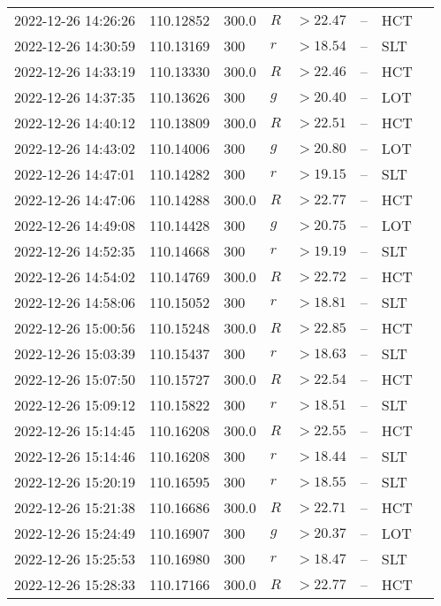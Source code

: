 \documentclass{nature_plusfigure}
\begin{document}
\begin{supplement}
\begin{center}
\begin{longtable}{llllllll}
2022-12-26 14:26:26 & 110.12852 & 300.0 & $R$ & $>22.47$ & -- & HCT &  \\ 
2022-12-26 14:30:59 & 110.13169 & 300 & $r$ & $>18.54$ & -- & SLT &  \\ 
2022-12-26 14:33:19 & 110.13330 & 300.0 & $R$ & $>22.46$ & -- & HCT &  \\ 
2022-12-26 14:37:35 & 110.13626 & 300 & $g$ & $>20.40$ & -- & LOT &  \\ 
2022-12-26 14:40:12 & 110.13809 & 300.0 & $R$ & $>22.51$ & -- & HCT &  \\ 
2022-12-26 14:43:02 & 110.14006 & 300 & $g$ & $>20.80$ & -- & LOT &  \\ 
2022-12-26 14:47:01 & 110.14282 & 300 & $r$ & $>19.15$ & -- & SLT &  \\ 
2022-12-26 14:47:06 & 110.14288 & 300.0 & $R$ & $>22.77$ & -- & HCT &  \\ 
2022-12-26 14:49:08 & 110.14428 & 300 & $g$ & $>20.75$ & -- & LOT &  \\ 
2022-12-26 14:52:35 & 110.14668 & 300 & $r$ & $>19.19$ & -- & SLT &  \\ 
2022-12-26 14:54:02 & 110.14769 & 300.0 & $R$ & $>22.72$ & -- & HCT &  \\ 
2022-12-26 14:58:06 & 110.15052 & 300 & $r$ & $>18.81$ & -- & SLT &  \\ 
2022-12-26 15:00:56 & 110.15248 & 300.0 & $R$ & $>22.85$ & -- & HCT &  \\ 
2022-12-26 15:03:39 & 110.15437 & 300 & $r$ & $>18.63$ & -- & SLT &  \\ 
2022-12-26 15:07:50 & 110.15727 & 300.0 & $R$ & $>22.54$ & -- & HCT &  \\ 
2022-12-26 15:09:12 & 110.15822 & 300 & $r$ & $>18.51$ & -- & SLT &  \\ 
2022-12-26 15:14:45 & 110.16208 & 300.0 & $R$ & $>22.55$ & -- & HCT &  \\ 
2022-12-26 15:14:46 & 110.16208 & 300 & $r$ & $>18.44$ & -- & SLT &  \\ 
2022-12-26 15:20:19 & 110.16595 & 300 & $r$ & $>18.55$ & -- & SLT &  \\ 
2022-12-26 15:21:38 & 110.16686 & 300.0 & $R$ & $>22.71$ & -- & HCT &  \\ 
2022-12-26 15:24:49 & 110.16907 & 300 & $g$ & $>20.37$ & -- & LOT &  \\ 
2022-12-26 15:25:53 & 110.16980 & 300 & $r$ & $>18.47$ & -- & SLT &  \\ 
2022-12-26 15:28:33 & 110.17166 & 300.0 & $R$ & $>22.77$ & -- & HCT &  \\ 

\end{longtable}
\end{center}
\end{supplement}
\end{document}
